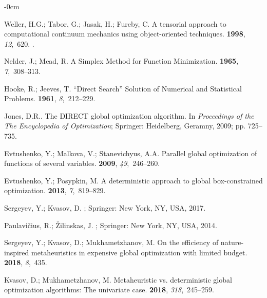 \documentclass[mathematics,article,accept,pdftex,moreauthors]{Definitions/mdpi}
\begin{document}
\begin{adjustwidth}{-\extralength}{0cm}
\begin{thebibliography}{999}
Weller, H.G.; Tabor, G.; Jasak, H.; Fureby, C.
\newblock A tensorial approach to computational continuum mechanics using
  object-oriented techniques.
 {\bf 1998}, {\em 12},~620.
.

Nelder, J.; Mead, R.
\newblock A Simplex Method for Function Minimization.
 {\bf 1965}, {\em 7},~308--313.

Hooke, R.; Jeeves, T.
\newblock ``\uppercase{D}irect Search'' Solution of Numerical and Statistical
  Problems.
 {\bf 1961}, {\em 8},~212--229.

{Jones, D.R.}.
\newblock The \uppercase{DIRECT} global optimization algorithm.
\newblock In \emph{Proceedings of the The Encyclopedia of Optimization};  Springer: 
  Heidelberg, Geramny, 2009; pp. 725--735.

Evtushenko, Y.; Malkova, V.; Stanevichyus, A.A.
\newblock Parallel global optimization of functions of several variables.
 {\bf 2009}, {\em 49},~246--260.

Evtushenko, Y.; Posypkin, M.
\newblock A deterministic approach to global box-constrained optimization.
 {\bf 2013}, {\em 7},~819--829.

Sergeyev, Y.; Kvasov, D.
; Springer: New York, NY, USA,   2017.

Paulavi{\v c}ius, R.; {\v Z}ilinskas, J.
; Springer: New York,  NY, USA,    2014.

Sergeyev, Y.; Kvasov, D.; Mukhametzhanov, M.
\newblock On the efficiency of nature-inspired metaheuristics in expensive
  global optimization with limited budget.
 {\bf 2018}, {\em 8},~435.

Kvasov, D.; Mukhametzhanov, M.
\newblock Metaheuristic vs. deterministic global optimization algorithms: The
  univariate case.
 {\bf 2018}, {\em 318},~245--259.


\end{thebibliography}
\end{adjustwidth}
\end{document}
